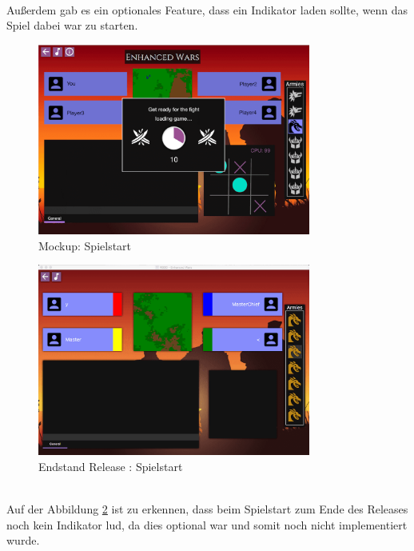 \documentclass[12pt, titlepage]{scrartcl}
\newcommand{\RN}[1]{%
	\textup{\uppercase\expandafter{\romannumeral#1}}%
}
\begin{document}
			\ \\  Au{\ss}erdem gab es ein optionales Feature, dass ein Indikator laden sollte, wenn das Spiel dabei war zu starten.
			\begin{figure}[H] 
				\centering
				\includegraphics[width=0.8\textwidth]{images/mockups/StartGame.png}
				\caption{Mockup: Spielstart}
				\label{Game_Start_2}
			\end{figure}
			\begin{figure}[H] 
				\centering
				\includegraphics[width=0.8\textwidth]{images/endOfRelease/StartGame.png}
				\caption{Endstand Release \RN{3}: Spielstart}
				\label{End_Game_Start}
			\end{figure}
			\ \\ Auf der Abbildung \ref{End_Game_Start} ist zu erkennen, dass beim Spielstart zum Ende des Releases noch kein Indikator lud, da dies optional war und somit noch nicht implementiert wurde.
\end{document}
